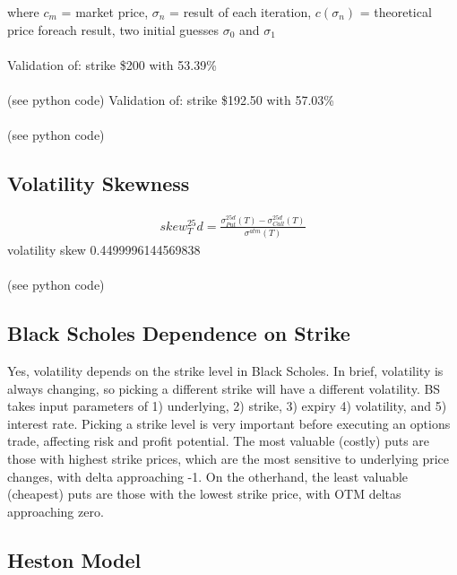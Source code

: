\documentclass{article}
\begin{document}
where $c_m$ = market price,
$\sigma_n$ = result of each iteration, $c(\sigma_n)$ = theoretical price foreach result,
two initial guesses $\sigma_0$ and $\sigma_1$
\\\\
Validation of: strike \$200 with 53.39\%
\\\\
(see python code)
Validation of: strike \$192.50 with 57.03\%
\\\\
(see python code)










\subsection{Volatility Skewness} 

\begin{equation}
\begin{split}
skew_T^25d = 
\frac{
\sigma_{Put}^{25d}(T) - \sigma_{Call}^{25d}(T)}{\sigma^{atm}(T)
}
\end{split}
\end{equation}
volatility skew 0.4499996144569838
\\\\
(see python code)

\cite{skew}

\subsection{Black Scholes Dependence on Strike} 

Yes, volatility depends on the strike level in Black Scholes. In brief, volatility is always changing, so picking a different strike will have a different volatility. BS takes input parameters of 1) underlying, 2) strike, 3) expiry 4) volatility, and 5) interest rate. Picking a strike level is very important before executing an options trade, affecting risk and profit potential.  The most valuable (costly) puts are those with highest strike prices, which are the most sensitive to underlying price changes, with delta approaching -1. On the otherhand, the least valuable (cheapest) puts are those with the lowest strike price, with OTM deltas approaching zero.

\subsection{Heston Model} 
\end{document}
